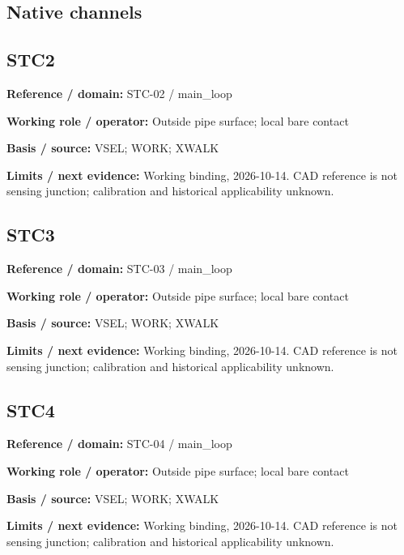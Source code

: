 \documentclass[11pt]{article}
\begin{document}
\subsection{Native channels}
\par\noindent\begin{minipage}{\textwidth}\small\setlength{\parskip}{2pt}
\subsection*{STC2}
\textbf{Reference / domain:} STC-02 / main\_\allowbreak{}loop\par
\textbf{Working role / operator:} Outside pipe surface; local bare contact\par
\textbf{Basis / source:} VSEL; WORK; XWALK\par
\textbf{Limits / next evidence:} Working binding, 2026-10-14. CAD reference is not sensing junction; calibration and historical applicability unknown.\par
\end{minipage}\par\vspace{5pt}
\par\noindent\begin{minipage}{\textwidth}\small\setlength{\parskip}{2pt}
\subsection*{STC3}
\textbf{Reference / domain:} STC-03 / main\_\allowbreak{}loop\par
\textbf{Working role / operator:} Outside pipe surface; local bare contact\par
\textbf{Basis / source:} VSEL; WORK; XWALK\par
\textbf{Limits / next evidence:} Working binding, 2026-10-14. CAD reference is not sensing junction; calibration and historical applicability unknown.\par
\end{minipage}\par\vspace{5pt}
\par\noindent\begin{minipage}{\textwidth}\small\setlength{\parskip}{2pt}
\subsection*{STC4}
\textbf{Reference / domain:} STC-04 / main\_\allowbreak{}loop\par
\textbf{Working role / operator:} Outside pipe surface; local bare contact\par
\textbf{Basis / source:} VSEL; WORK; XWALK\par
\textbf{Limits / next evidence:} Working binding, 2026-10-14. CAD reference is not sensing junction; calibration and historical applicability unknown.\par
\end{minipage}\par\vspace{5pt}
\end{document}
